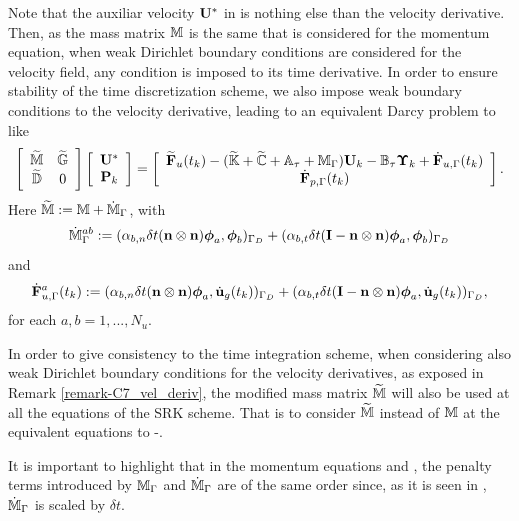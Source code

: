 \begin{remark}
\label{remark-C7_vel_deriv}
Note that the auxiliar velocity $ {\bf U}^* $ in  is nothing else than the velocity derivative. Then, as the mass matrix $ \mathbb{M} $ is the same that is considered for the momentum equation, when weak Dirichlet boundary conditions are considered for the velocity field, any condition is imposed to its time derivative. In order to ensure stability of the time discretization scheme, we also impose weak boundary conditions to the velocity derivative, leading to an equivalent Darcy problem to  like 
\begin{equation}
\label{eq-C7_SRK_upeta_RK_p_darcy_weak_deriv}
\left[\begin{array}{cc}
\widetilde{\mathbb{M}}&\widetilde{\mathbb{G}}\\
\widetilde{\mathbb{D}}&0
\end{array}\right]\left[\begin{array}{c}
{\bf U}^*\\
{\bf P}_k
\end{array}\right]=\left[\begin{array}{c}
\widetilde{{\bf F}}_u(t_k)-(\widetilde{\mathbb{K}}+\widetilde{\mathbb{C}}+\mathbb{A}_\tau+\mathbb{M}_\Gamma){\bf U}_k-\mathbb{B}_\tau\boldsymbol{\Upsilon}_k+\dot{{\bf F}}_{u,\Gamma}(t_k)\\
\dot{{\bf F}}_{p,\Gamma}(t_k)
\end{array}\right].
\end{equation}
Here $ \widetilde{\mathbb{M}}:=\mathbb{M}+\dot{\mathbb{M}}_\Gamma $, with 
\begin{equation}
\label{eq-C7_M_deriv}
\dot{\mathbb{M}}_\Gamma^{ab}:=(\alpha_{b,n}\delta t({\bf n}\otimes{\bf n})\boldsymbol{\phi}_{a},\boldsymbol{\phi}_{b})_{\Gamma_D}+(\alpha_{b,t}\delta t(\mathbf{I}-{\bf n}\otimes{\bf n})\boldsymbol{\phi}_{a},\boldsymbol{\phi}_{b})_{\Gamma_D}
\end{equation}
and $$ \dot{{\bf F}}_{u,\Gamma}^a(t_k):= (\alpha_{b,n}\delta t({\bf n}\otimes{\bf n})\boldsymbol{\phi}_{a},\dot{{\bf u}}_g(t_k))_{\Gamma_D}+(\alpha_{b,t}\delta t(\mathbf{I}-{\bf n}\otimes{\bf n})\boldsymbol{\phi}_{a},\dot{{\bf u}}_g(t_k))_{\Gamma_D},$$ for each $a,b=1,...,N_u$.
\end{remark}	

\begin{remark}
In order to give consistency to the time integration scheme, when considering also weak Dirichlet boundary conditions for the velocity derivatives, as exposed in Remark \ref{remark-C7_vel_deriv}, the modified mass matrix $ \widetilde{\mathbb{M}} $ will also be used at all the equations of the SRK scheme. That is to consider $ \widetilde{\mathbb{M}} $ instead of $ \mathbb{M} $ at the equivalent equations to -.

It is important to highlight that in the momentum equations  and , the penalty terms introduced by $ \mathbb{M}_\Gamma $ and $ \dot{\mathbb{M}}_\Gamma $ are of the same order since, as it is seen in , $ \dot{\mathbb{M}}_\Gamma $ is scaled by $ \delta t $.
\end{remark}

